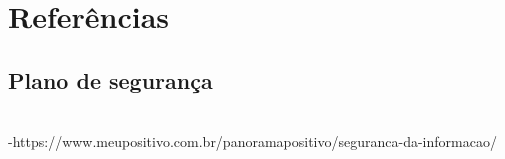 \chapter{Referências}
\label{referencias}
\section{Plano de segurança}
\\
-https://www.meupositivo.com.br/panoramapositivo/seguranca-da-informacao/